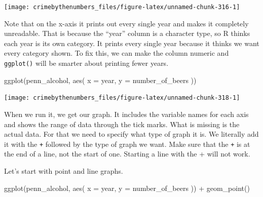 \documentclass[
]{krantz}
\makeatletter
\newenvironment{Shaded}{\begin{snugshade}}{\end{snugshade}}
\newcommand{\AttributeTok}[1]{\textcolor[rgb]{0.61,0.61,0.61}{#1}}
\newcommand{\FunctionTok}[1]{\textcolor[rgb]{0,0,0}{#1}}
\newcommand{\NormalTok}[1]{#1}
\newcommand{\OtherTok}[1]{\textcolor[rgb]{0.37,0.37,0.37}{#1}}
\newcommand{\SpecialCharTok}[1]{\textcolor[rgb]{0,0,0}{#1}}
\newenvironment{kframe}{%
\medskip{}
\setlength{\fboxsep}{.8em}
 \def\at@end@of@kframe{}%
 \ifinner\ifhmode%
  \def\at@end@of@kframe{\end{minipage}}%
  \begin{minipage}{\columnwidth}%
 \fi\fi%
 \def\FrameCommand##1{\hskip\@totalleftmargin \hskip-\fboxsep
 \colorbox{shadecolor}{##1}\hskip-\fboxsep
     \hskip-\linewidth \hskip-\@totalleftmargin \hskip\columnwidth}%
 \MakeFramed {\advance\hsize-\width
   \@totalleftmargin\z@ \linewidth\hsize
   \@setminipage}}%
 {\par\unskip\endMakeFramed%
 \at@end@of@kframe}
\renewenvironment{Shaded}{\begin{kframe}}{\end{kframe}}
\makeatother
\begin{document}
\begin{center}\texttt{[image: crimebythenumbers\_files/figure-latex/unnamed-chunk-316-1]} \end{center}

Note that on the x-axis it prints out every single year and
makes it completely unreadable. That is because the ``year''
column is a character type, so R thinks each year is its own
category. It prints every single year because it thinks we
want every category shown. To fix this, we can make the
column numeric and \texttt{ggplot()} will be smarter about
printing fewer years.

\begin{Shaded}
\end{Shaded}

\begin{Shaded}
\begin{Highlighting}[]
\FunctionTok{ggplot}\NormalTok{(penn\_alcohol, }\FunctionTok{aes}\NormalTok{(}
  \AttributeTok{x =}\NormalTok{ year,}
  \AttributeTok{y =}\NormalTok{ number\_of\_beers}
\NormalTok{))}
\end{Highlighting}
\end{Shaded}

\begin{center}\texttt{[image: crimebythenumbers\_files/figure-latex/unnamed-chunk-318-1]} \end{center}

When we run it, we get our graph. It includes the variable
names for each axis and shows the range of data through the
tick marks. What is missing is the actual data. For that we
need to specify what type of graph it is. We literally add
it with the \texttt{+} followed by the type of graph we
want. Make sure that the \texttt{+} is at the end of a line,
not the start of one. Starting a line with the + will not
work.

Let's start with point and line graphs.

\begin{Shaded}
\begin{Highlighting}[]
\FunctionTok{ggplot}\NormalTok{(penn\_alcohol, }\FunctionTok{aes}\NormalTok{(}
  \AttributeTok{x =}\NormalTok{ year,}
  \AttributeTok{y =}\NormalTok{ number\_of\_beers}
\NormalTok{)) }\SpecialCharTok{+}
  \FunctionTok{geom\_point}\NormalTok{()}
\end{Highlighting}
\end{Shaded}
\end{document}
